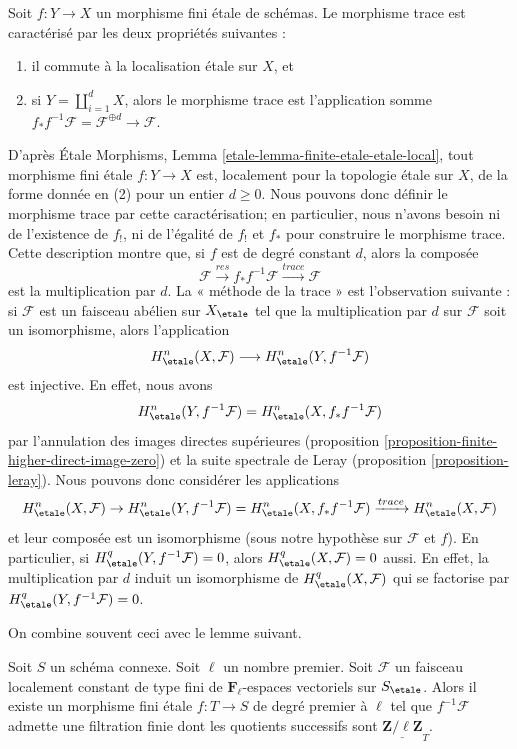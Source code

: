 \noindent
Soit $f : Y \to X$ un morphisme fini \'etale de sch\'emas. Le morphisme trace est
caract\'eris\'e par les deux propri\'et\'es suivantes :
\begin{enumerate}
\item il commute \`a la localisation \'etale sur $X$, et
\item si $Y = \coprod_{i = 1}^d X$, alors le morphisme trace est
l'application somme $f_*f^{-1} \mathcal{F} = \mathcal{F}^{\oplus d} \to \mathcal{F}$.
\end{enumerate}
D'apr\`es \'Etale Morphisms, Lemma \ref{etale-lemma-finite-etale-etale-local},
tout morphisme fini \'etale $f : Y \to X$ est, localement pour la topologie \'etale sur $X$,
de la forme donn\'ee en (2) pour un entier $d \geq 0$. Nous pouvons donc
d\'efinir le morphisme trace par cette caract\'erisation; en particulier,
nous n'avons besoin ni de l'existence de $f_!$, ni de l'\'egalit\'e
de $f_!$ et $f_*$ pour construire le morphisme trace.
Cette description montre que, si $f$ est de degr\'e constant $d$, alors
la compos\'ee
$$
\mathcal{F} \xrightarrow{res}
f_* f^{-1} \mathcal{F} \xrightarrow{trace}
\mathcal{F}
$$
est la multiplication par $d$. La « m\'ethode de la trace »
est l'observation suivante : si $\mathcal{F}$
est un faisceau ab\'elien sur $X_\etale$ tel que la multiplication par $d$
sur $\mathcal{F}$ soit un isomorphisme, alors l'application
$$
H^n_\etale(X, \mathcal{F}) \longrightarrow H^n_\etale(Y, f^{-1}\mathcal{F})
$$
est injective. En effet, nous avons
$$
H^n_\etale(Y, f^{-1}\mathcal{F}) = H^n_\etale(X, f_*f^{-1}\mathcal{F})
$$
par l'annulation des images directes sup\'erieures
(proposition \ref{proposition-finite-higher-direct-image-zero})
et la suite spectrale de Leray
(proposition \ref{proposition-leray}).
Nous pouvons donc consid\'erer les applications
$$
H^n_\etale(X, \mathcal{F}) \to
H^n_\etale(Y, f^{-1}\mathcal{F})= H^n_\etale(X, f_*f^{-1}\mathcal{F})
\xrightarrow{trace}
H^n_\etale(X, \mathcal{F})
$$
et leur compos\'ee est un isomorphisme (sous notre hypoth\`ese sur $\mathcal{F}$
et $f$). En particulier, si
$H_\etale^q(Y, f^{-1}\mathcal{F}) = 0$, alors
$H_\etale^q(X, \mathcal{F}) = 0$ aussi.
En effet, la multiplication par $d$ induit un
isomorphisme de $H_\etale^q(X, \mathcal{F})$ qui se factorise par
$H_\etale^q(Y, f^{-1}\mathcal{F})= 0$.

\medskip\noindent
On combine souvent ceci avec le lemme suivant.

\begin{lemma}
\label{lemma-pullback-filtered}
Soit $S$ un sch\'ema connexe. Soit $\ell$ un nombre premier. Soit
$\mathcal{F}$ un faisceau localement constant de type fini de
$\mathbf{F}_\ell$-espaces vectoriels sur $S_\etale$.
Alors il existe un morphisme fini \'etale
$f : T \to S$ de degr\'e premier \`a $\ell$ tel que $f^{-1}\mathcal{F}$
admette une filtration finie dont les quotients successifs sont
$\underline{\mathbf{Z}/\ell\mathbf{Z}}_T$.
\end{lemma}

